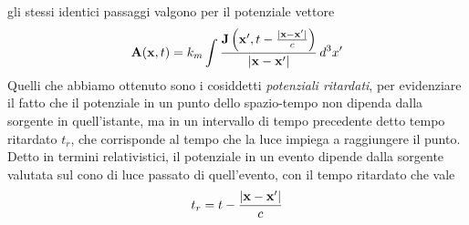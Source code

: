 gli stessi identici passaggi valgono per il potenziale vettore
\begin{align} \label{eq:_potenziale_vettore_ritardato}
  \mathbf{ A }(\mathbf{ x },t) = k_m  \int\frac{\mathbf{J}\left(\mathbf{x}',t-\frac{|\mathbf{x-x'}|}{c} \right)}{|\mathbf{x-x'}|} \,d^3x'
\end{align}
Quelli che abbiamo ottenuto sono i cosiddetti \textit{potenziali ritardati}, per evidenziare il fatto che il potenziale in un punto dello spazio-tempo
non dipenda dalla sorgente in quell'istante, ma in un intervallo di tempo precedente detto tempo ritardato $ t_r $, che corrisponde al tempo che la luce 
impiega a raggiungere il punto. Detto in termini relativistici, il potenziale in un evento dipende dalla sorgente valutata sul cono di luce passato di 
quell'evento, con il tempo ritardato che vale
\begin{align}
  t_r = t - \frac{|\mathbf{ x-x' }|}{c}
\end{align}


